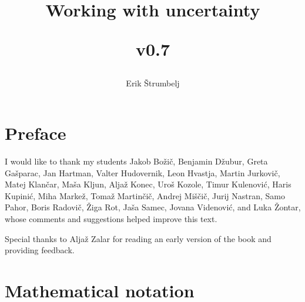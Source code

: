 \documentclass{book}
\title{\textbf{Working with uncertainty}\\ \begin{small}v0.7\end{small}}
\author{Erik \v{S}trumbelj}
\theoremstyle{plain}%
\theoremstyle{definition}
\begin{document}
\maketitle

\newpage

\tableofcontents

\chapter*{Preface}

I would like to thank my students Jakob Bo\v{z}i\v{c}, Benjamin Džubur, Greta Ga\v{s}parac, Jan Hartman, Valter Hudovernik, Leon Hvastja, Martin Jurkovi\v{c}, Matej Klan\v{c}ar, Ma\v{s}a Kljun, Alja\v{z} Konec, Uro\v{s} Kozole, Timur Kulenovi\'{c}, Haris Kupini\'{c}, Miha Marke\v{z}, Toma\v{z} Martin\v{c}i\v{c}, Andrej Mi\v{s}\v{c}i\v{c}, Jurij Nastran, Samo Pahor, Boris Radovič, \v{Z}iga Rot, Ja\v{s}a Samec, Jovana Videnovi\'{c}, and Luka \v{Z}ontar, whose comments and suggestions helped improve this text.

Special thanks to Alja\v{z} Zalar for reading an early version of the book and providing feedback.


\chapter*{Mathematical notation}
\end{document}
